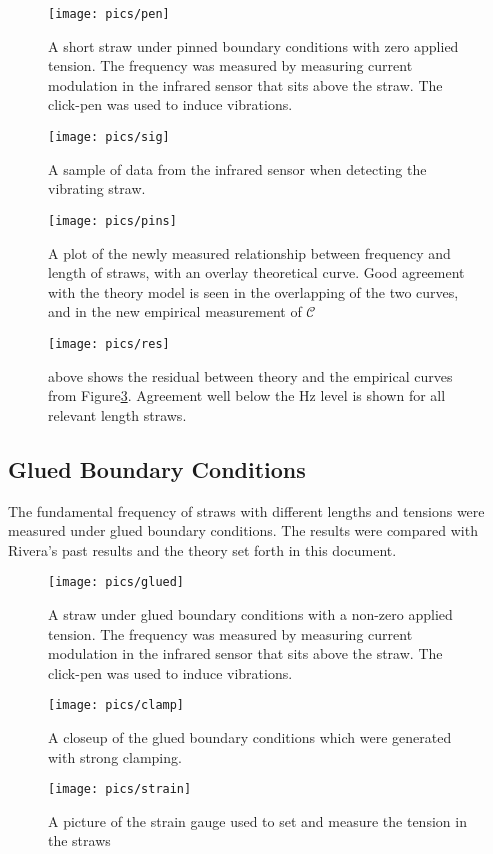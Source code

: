 \documentclass[twoside]{article}
\begin{document}
\begin{multicols}{2}
\begin{figure}[H]
	\texttt{[image: pics/pen]}
	\caption{A short straw under pinned boundary conditions with zero applied tension. The frequency was measured by measuring current modulation in the infrared sensor that sits above the straw. The click-pen was used to induce vibrations.}
	\label{fig:[pen]}
\end{figure}

\begin{figure}[H]
	\texttt{[image: pics/sig]}
	\caption{A sample of data from the infrared sensor when detecting the vibrating straw.}
	\label{fig:sig}
\end{figure}

\begin{figure}[H]
	\texttt{[image: pics/pins]}
	\caption{A plot of the newly measured relationship between frequency and length of straws, with an overlay theoretical curve. Good agreement with the theory model is seen in the overlapping of the two curves, and in the new empirical measurement of $\mathcal{C}$  }
	\label{fig:pins}
\end{figure}

\begin{figure}[H]
	\texttt{[image: pics/res]}
	\caption{above shows the residual between theory and the empirical curves from Figure\ref{fig:pins}. Agreement well below the Hz level is shown for all relevant length straws.  }
	\label{fig:res}
\end{figure}

\subsection{Glued Boundary Conditions}
The fundamental frequency of straws with different lengths and tensions were measured under glued boundary conditions. The results were compared with Rivera's past results and the theory set forth in this document. 
\begin{figure}[H]
	\texttt{[image: pics/glued]}
	\caption{A straw under glued boundary conditions with a non-zero applied tension. The frequency was measured by measuring current modulation in the infrared sensor that sits above the straw. The click-pen was used to induce vibrations. }
	\label{fig:glued}
\end{figure}
\begin{figure}[H]
	\texttt{[image: pics/clamp]}
	\caption{A closeup of the glued boundary conditions which were generated with strong clamping.}
	\label{fig:clamp}
\end{figure}
\begin{figure}[H]
	\texttt{[image: pics/strain]}
	\caption{A picture of the strain gauge used to set and measure the tension in the straws}
	\label{fig:strain}
\end{figure}



\end{multicols}
\end{document}
